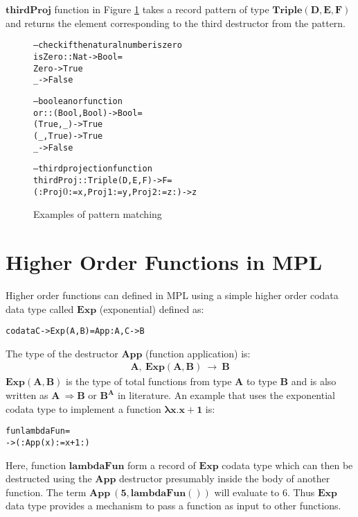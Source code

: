 \documentclass[11pt]{article}
\begin{document}
~~\\~~\\ 
$\mathbf{thirdProj}$ function in Figure \ref{seqMPL:pattMatchExample} takes a record pattern of type $\mathbf{Triple(D,E,F)}$ and returns the element corresponding to the third destructor from the pattern. 
\begin{figure}[!h]
\begin{alltt}

              -- check if the natural number is zero
              isZero :: Nat -> Bool =
                Zero -> True
                _    -> False


              -- boolean or function
              or :: (Bool,Bool) -> Bool =
                (True,_) -> True  
                (_,True) -> True
                _        -> False
              
              -- third projection function
              thirdProj :: Triple(D,E,F) -> F =
                (:Proj\(0\) := x, Proj1 := y, Proj2 := z :) -> z
\end{alltt} 
\caption{Examples of pattern matching}
\label{seqMPL:pattMatchExample}
\end{figure}

\section {Higher Order Functions in MPL}\label{SeqMPL:HigherOrder}
Higher order functions can defined in MPL using a simple higher order codata data type called $\mathbf {Exp}$ (exponential) defined as:
\begin{alltt}
          codata C -> Exp(A,B) = App : A,C -> B
\end{alltt}
The type of the destructor $\mathbf{App}$ (function application) is: 
\begin{align*}
  \mathbf{A,~Exp(A,B)~ \to~ B}
\end{align*}
$\mathbf{Exp(A,B)}$ is the type of total functions from type $\mathbf{A}$ to type $\mathbf{B}$ and is also written as $\mathbf {A~\Rightarrow B}$ or $\mathbf{B^{A}}$ in literature. An example that uses the exponential codata type to implement a function $\mathbf{\lambda x.x+1}$ is: 
\begin{alltt}
                fun lambdaFun  =
                   ->  (: App(x) :=  x + 1 :)          
\end{alltt}
Here, function $\mathbf{lambdaFun}$ form a record of $\mathbf{Exp}$ codata type which can then be destructed using the $\mathbf{App}$ destructor presumably inside the body of another function. The term $\mathbf{App~(5,lambdaFun())}$ will evaluate to 6. Thus $\mathbf{Exp}$ data type provides a mechanism to pass a function as input to other functions.
\end{document}
